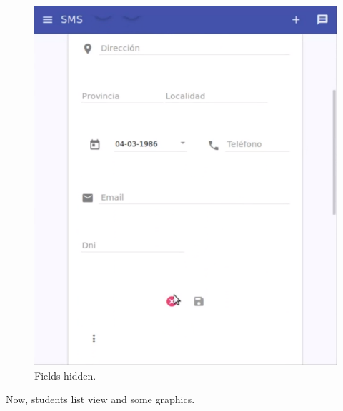 \begin{figure}[H]
\begin{minipage}{.5\textwidth}
  \includegraphics[scale=0.3]{img/snaps/teacher_profile_update2.png}
  \caption{Fields hidden.}
\end{minipage}
\end{figure}

\pagebreak
\noindent Now, students list view and some graphics.


